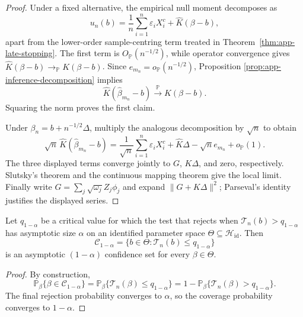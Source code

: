 \begin{proof}
Under a fixed alternative, the empirical null moment decomposes as
\[
 u_n(b)
 =\frac1n\sum_{i=1}^n\varepsilon_iX_i^c
  +\widehat K(\beta-b),
\]
apart from the lower-order sample-centring term treated in
Theorem~\ref{thm:app-late-stopping}.  The first term is
$O_{\mathbb P}(n^{-1/2})$, while operator convergence gives
$\widehat K(\beta-b)\to_{\mathbb P}K(\beta-b)$.  Since
$e_{m_n}=o_{\mathbb P}(n^{-1/2})$, Proposition
\ref{prop:app-inference-decomposition} implies
\[
 \widehat K(\widehat\beta_{m_n}-b)
 \xrightarrow{\mathbb P}K(\beta-b).
\]
Squaring the norm proves the first claim.

Under $\beta_n=b+n^{-1/2}\Delta$, multiply the analogous decomposition by
$\sqrt n$ to obtain
\[
 \sqrt n\,\widehat K(\widehat\beta_{m_n}-b)
 =\frac1{\sqrt n}\sum_{i=1}^n\varepsilon_iX_i^c
  +\widehat K\Delta-\sqrt n e_{m_n}+o_{\mathbb P}(1).
\]
The three displayed terms converge jointly to $G$, $K\Delta$, and zero,
respectively.  Slutsky's theorem and the continuous mapping theorem give the
local limit.  Finally write
$G=\sum_j\sqrt{\omega_j}Z_j\phi_j$ and expand
$\|G+K\Delta\|^2$; Parseval's identity justifies the displayed series.
\end{proof}

\begin{corollary}
\label{cor:app-confidence-inversion}
Let $q_{1-\alpha}$ be a critical value for which the test that rejects when
$\mathcal T_n(b)>q_{1-\alpha}$ has asymptotic size $\alpha$ on an identified
parameter space $\Theta\subseteq\mathcal H_{\mathrm{id}}$.  Then
\[
 \mathcal C_{1-\alpha}
 =\{b\in\Theta:\mathcal T_n(b)\leq q_{1-\alpha}\}
\]
is an asymptotic $(1-\alpha)$ confidence set for every $\beta\in\Theta$.
\end{corollary}

\begin{proof}
By construction,
\[
 \mathbb P_\beta\{\beta\in\mathcal C_{1-\alpha}\}
 =\mathbb P_\beta\{\mathcal T_n(\beta)\leq q_{1-\alpha}\}
 =1-\mathbb P_\beta\{\mathcal T_n(\beta)>q_{1-\alpha}\}.
\]
The final rejection probability converges to $\alpha$, so the coverage
probability converges to $1-\alpha$.
\end{proof}

